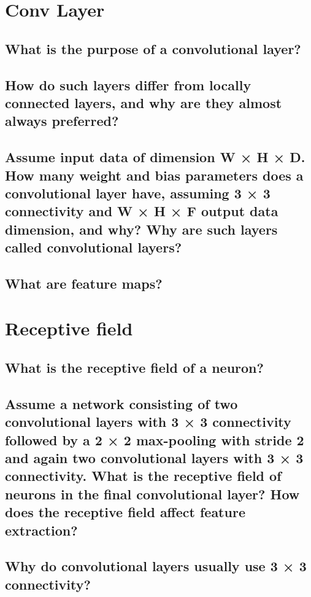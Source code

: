 \section{Conv Layer}

\subsection{What is the purpose of a convolutional layer?}

\subsection{How do such layers differ from locally connected layers, and why are they almost always preferred?}

\subsection{Assume input data of dimension W × H × D. How many weight and bias parameters does a convolutional layer have, assuming 3 × 3 connectivity and W × H × F output data dimension, and why? Why are such layers called convolutional layers?}

\subsection{What are feature maps?}

\section{Receptive field}

\subsection{What is the receptive field of a neuron?}

\subsection{Assume a network consisting of two convolutional layers with 3 × 3 connectivity followed by a 2 × 2 max-pooling with stride 2 and again two convolutional layers with 3 × 3 connectivity. What is the receptive field of neurons in the final convolutional layer? How does the receptive field affect feature extraction? }

\subsection{Why do convolutional layers usually use 3 × 3 connectivity?}

